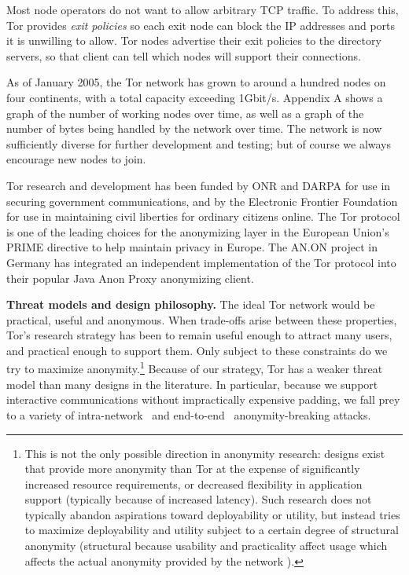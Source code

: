 \documentclass{llncs}
\begin{document}
Most node operators do not want to allow arbitrary TCP traffic. %
To address this, Tor provides \emph{exit policies} so
each exit node can block the IP addresses and ports it is unwilling to allow.
Tor nodes advertise their exit policies to the directory servers, so that
client can tell which nodes will support their connections.

As of January 2005, the Tor network has grown to around a hundred nodes
on four continents, with a total capacity exceeding 1Gbit/s. Appendix A
shows a graph of the number of working nodes over time, as well as a
graph of the number of bytes being handled by the network over time.
The network is now sufficiently diverse for further development
and testing; but of course we always encourage new nodes
to join.

Tor research and development has been funded by ONR and DARPA
for use in securing government
communications, and by the Electronic Frontier Foundation for use
in maintaining civil liberties for ordinary citizens online. The Tor
protocol is one of the leading choices
for the anonymizing layer in the European Union's PRIME directive to
help maintain privacy in Europe.
The AN.ON project in Germany
has integrated an independent implementation of the Tor protocol into
their popular Java Anon Proxy anonymizing client.

\medskip
\noindent
{\bf Threat models and design philosophy.}
The ideal Tor network would be practical, useful and anonymous. When
trade-offs arise between these properties, Tor's research strategy has been
to remain useful enough to attract many users,
and practical enough to support them.  Only subject to these
constraints do we try to maximize
anonymity.\footnote{This is not the only possible
direction in anonymity research: designs exist that provide more anonymity
than Tor at the expense of significantly increased resource requirements, or
decreased flexibility in application support (typically because of increased
latency).  Such research does not typically abandon aspirations toward
deployability or utility, but instead tries to maximize deployability and
utility subject to a certain degree of structural anonymity (structural because
usability and practicality affect usage which affects the actual anonymity
provided by the network \cite{econymics,back01}).}
Because of our strategy, Tor has a weaker threat model than many designs in
the literature.  In particular, because we
support interactive communications without impractically expensive padding,
we fall prey to a variety
of intra-network~\cite{back01,attack-tor-oak05,flow-correlation04} and
end-to-end~\cite{danezis-pet2004,SS03} anonymity-breaking attacks.
\end{document}
